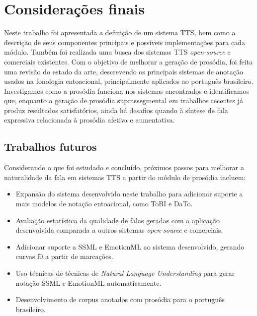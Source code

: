 
\chapter{Considerações finais}
Neste trabalho foi apresentada a definição de um sistema TTS, bem como a descrição
de seus componentes principais e possíveis implementações para cada módulo.
Também foi realizada uma busca dos sistemas TTS \emph{open-source} e comerciais
existentes. Com o objetivo de melhorar a geração de prosódia, foi feita uma
revisão do estado da arte, descrevendo os principais sistemas de anotação usados na
fonologia entoacional, principalmente aplicados ao português brasileiro.
Investigamos como a prosódia funciona nos sistemas encontrados e identificamos
que, enquanto a geração de prosódia suprassegmental em trabalhos recentes já
produz resultados satisfatórios, ainda há desafios quando à síntese de fala
expressiva relacionada à prosódia afetiva e aumentativa.

\section{Trabalhos futuros}
Considerando o que foi estudado e concluído, próximos passos para melhorar a
naturalidade da fala em sistemas TTS a partir do módulo de prosódia incluem:

\begin{itemize}
\item Expansão do sistema desenvolvido neste trabalho para adicionar suporte a
  mais modelos de notação entoacional, como ToBI e DaTo.
\item Avaliação estatística da qualidade de falas geradas com a aplicação desenvolvida comparada a outros sistemas \emph{open-source} e comerciais.
\item Adicionar suporte a SSML e EmotionML ao sistema desenvolvido, gerando
  curvas f0 a partir de marcações.
\item Uso técnicas de técnicas de \emph{Natural Language Understanding} para
  gerar notação SSML e EmotionML automaticamente.
\item Desenvolvimento de corpus anotados com prosódia para o português brasileiro.
\end{itemize}

